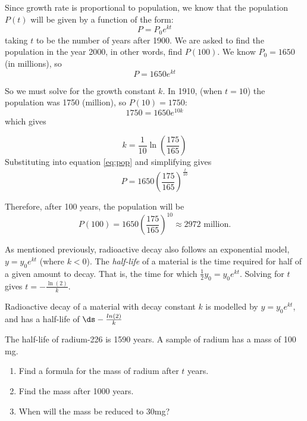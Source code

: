 \begin{solution}
Since growth rate is proportional to population, we 
know that the population  $P(t)$ will be given by a function of the form:
\[
P=P_0e^{kt}
\] 
taking $t$ to be the number of years after 1900.  
We are asked to find the population in the year 2000, in other words, find $P(100)$.  We know $P_0=1650$ (in millions), so 
\begin{equation} \label{eq:pop}
P=1650e^{kt}
\end{equation}


So we must solve for the growth constant $k$. In 1910, (when $t=10$) the population was 1750 (million), so  $ P(10)=1750 $:
\[
1750=1650e^{10k}
\]
which gives

\[
k=\frac{1}{10}\ln\left(\frac{175}{165}\right)
\]
Substituting into equation \ref{eq:pop} and simplifying gives 
\[
P=1650\left(\frac{175}{165}\right)^{\frac{t}{10}}
\]

Therefore, after 100 years, the population will be
\[
P(100)=1650\left(\frac{175}{165}\right)^{10}
\approx 2972 \textrm{ million.}
\]

\end{solution}

As mentioned previously, radioactive decay also follows an exponential model, $ y=y_0e^{kt} $ (where $ k<0 $). The   \textit{half-life} of a material  is the time required for half of a given amount to decay. That is, the time for which $ \frac12y_0 = y_0e^{kt} $. Solving for $ t $ gives $ t=-\frac{\ln(2)}{k} $.

 \begin{formulabox}
 Radioactive decay of a material with decay constant $ k$ is modelled by $ y=y_0e^{kt} $, and has a half-life of $ \ds -\frac{ln(2)}{k} $    
 \end{formulabox} 


\begin{example}{}{}
The half-life of radium-226 is 1590 years.  A sample of radium has a mass of 100 mg.
\begin{enumerate}
\item Find a formula for the mass of radium after $ t $ years. 
\item Find the mass after 1000 years.

\item When will the mass be reduced to 30mg?
\end{enumerate}

\end{example}


